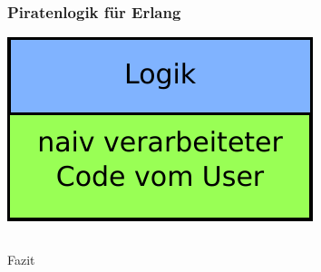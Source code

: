 \begin{frame}
\frametitle{Piratenlogik für Erlang}
\begin{center}

    \includegraphics[scale=1.0]{erlang/pics/ErlangVerarbeitungB}

\end{center}    

\end{frame}

\begin{frame}
\inputminted[linenos, frame=lines, tabsize=2, fontsize=\footnotesize , label=case when einzeilig]{erlang}{erlang/Beispiel.erl}
\begin{center}
 
\end{center}
\end{frame}

\begin{frame}
\begin{center}
\LARGE Fazit
\end{center}
\end{frame}
